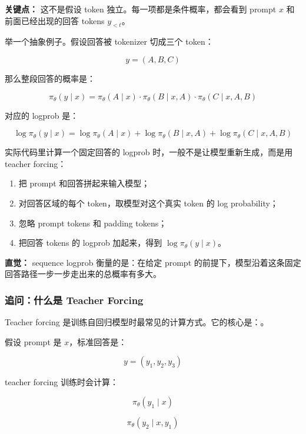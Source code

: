 \begin{warnbox}
\textbf{关键点：} 这不是假设 token 独立。每一项都是条件概率，都会看到 prompt $x$ 和前面已经出现的回答 tokens $y_{<t}$。
\end{warnbox}

举一个抽象例子。假设回答被 tokenizer 切成三个 token：

\[
y = (A, B, C)
\]

那么整段回答的概率是：

\[
\pi_\theta(y \mid x)
=
\pi_\theta(A \mid x)
\cdot
\pi_\theta(B \mid x,A)
\cdot
\pi_\theta(C \mid x,A,B)
\]

对应的 logprob 是：

\[
\log \pi_\theta(y \mid x)
=
\log \pi_\theta(A \mid x)
+
\log \pi_\theta(B \mid x,A)
+
\log \pi_\theta(C \mid x,A,B)
\]

实际代码里计算一个固定回答的 logprob 时，一般不是让模型重新生成，而是用 teacher forcing：

\begin{enumerate}[leftmargin=1.5em]
  \item 把 prompt 和回答拼起来输入模型；
  \item 对回答区域的每个 token，取模型对这个真实 token 的 log probability；
  \item 忽略 prompt tokens 和 padding tokens；
  \item 把回答 tokens 的 logprob 加起来，得到 $\log \pi_\theta(y \mid x)$。
\end{enumerate}

\begin{intubox}
\textbf{直觉：} sequence logprob 衡量的是：在给定 prompt 的前提下，模型沿着这条固定回答路径一步一步走出来的总概率有多大。
\end{intubox}

\subsubsection{追问：什么是 Teacher Forcing}

Teacher forcing 是训练自回归模型时最常见的计算方式。它的核心是：。

假设 prompt 是 $x$，标准回答是：

\[
y = (y_1, y_2, y_3)
\]

teacher forcing 训练时会计算：

\[
\pi_\theta(y_1 \mid x)
\]

\[
\pi_\theta(y_2 \mid x, y_1)
\]


